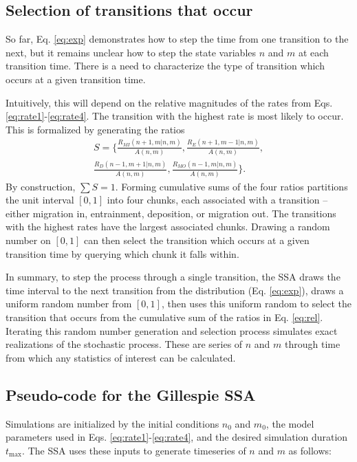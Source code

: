 \subsection{Selection of transitions that occur}
\label{sec:brr}
So far, Eq. \ref{eq:exp} demonstrates how to step the time from one transition to the next, but it remains unclear how to step the state variables $n$ and $m$ at each transition time. There is a need to characterize the type of transition which occurs at a given transition time.

Intuitively, this will depend on the relative magnitudes of the rates from Eqs. \ref{eq:rate1}-\ref{eq:rate4}.
The transition with the highest rate is most likely to occur.
This is formalized by generating the ratios
\begin{multline} S = \Bigg\{\frac{R_{MI}(n+1,m|n,m)}{ A(n,m)},
	\frac{R_E(n+1,m-1|n,m)}{ A(n,m)},\\
	\frac{R_D(n-1,m+1|n,m)}{ A(n,m)},
	\frac{R_{MO}(n-1,m|n,m)}{ A(n,m)}\Bigg\}. \label{eq:rel} \end{multline}
By construction, $\sum S=1$.
Forming cumulative sums of the four ratios partitions the unit interval $[0,1]$ into four chunks, each associated with a transition -- either migration in, entrainment, deposition, or migration out. The transitions with the highest rates have the largest associated chunks. Drawing a random number on $[0,1]$ can then select the transition which occurs at a given transition time by querying which chunk it falls within.

In summary, to step the process through a single transition, the SSA draws the time interval to the next transition from the distribution (Eq. \ref{eq:exp}), draws a uniform random number from $[0,1]$, then uses this uniform random to select the transition that occurs from the cumulative sum of the ratios in Eq. \ref{eq:rel}. Iterating this random number generation and selection process simulates exact realizations of the stochastic process. These are series of $n$ and $m$ through time from which any statistics of interest can be calculated.

\subsection{Pseudo-code for the Gillespie SSA}
\label{sec:crr}
Simulations are initialized by the initial conditions $n_0$ and $m_0$, the model parameters used in Eqs. \ref{eq:rate1}-\ref{eq:rate4}, and the desired simulation duration $t_\text{max}$. The SSA uses these inputs to generate timeseries of $n$ and $m$ as follows:

